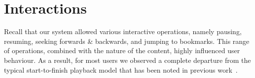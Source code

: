\section{Interactions}
\label{sect:interactions}


Recall that our system allowed various interactive operations, namely pausing, resuming, seeking forwards \& backwards, and jumping to bookmarks. This range of operations, combined with the nature of the content, highly influenced user behaviour. As a result, for most users we observed a complete departure from the typical start-to-finish playback model that has been noted in previous work~\cite{costa2004aci}.


